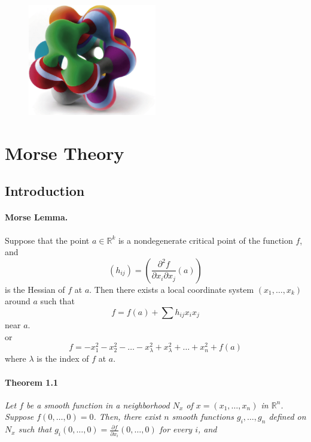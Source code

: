 \documentclass[]{article}
\begin{document}
 
\maketitle

\begin{figure}[h]
    \centering
    \includegraphics[width=0.50\textwidth]{cover}
\end{figure}
 
\tableofcontents
\newpage
\section{Morse Theory}
\subsection{Introduction}
    \paragraph{\textbf{Morse Lemma.}}
        Suppose that the point $a \in \mathbb{R}^k$ is a nondegenerate
        critical point of the function $f$, and
        $$
            (h_{ij})= \left(  \frac{\partial^2f}{\partial x_i \partial x_j} (a) \right)
        $$
        is the Hessian of $f$ at $a$. Then there exists a local coordinate system
        $(x_1,\ldots,x_k)$ around $a$ such that
        $$
            f=f(a)+\sum{h_{ij}x_ix_j}
        $$
        near $a$.
        \\
        or
        $$
            f=-x_1^2-x_2^2-\ldots-x_\lambda^2+x_\lambda^2+\ldots+x_n^2+f(a)
        $$
        where $\lambda$ is the index of $f$ at $a$.

    \paragraph{\textbf{Theorem 1.1}} \textit{ 
        Let $f$ be a smooth function in a neighborhood 
    $N_x$ of $x=(x_1,\ldots,x_n)$ in $\mathbb{R}^n$. Suppose $f(0,\ldots,0)=0$. Then, 
    there exist $n$ smooth functions $g_i,\ldots,g_n$ defined on $N_x$ such that $g_i(0,\ldots,0)=\frac{\partial f}{\partial x_i}(0,\ldots,0)$
    for every $i$, and
    }
\end{document}
